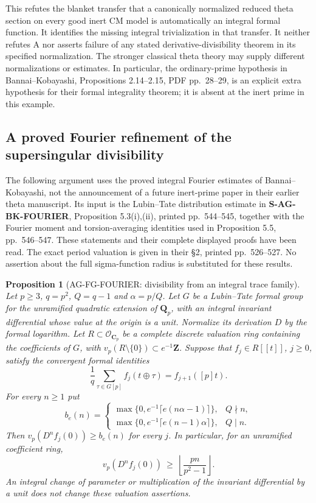 \documentclass[11pt,a4paper]{article}
\newtheorem{proposition}{Proposition}
\begin{document}
This refutes the blanket transfer that a canonically normalized
reduced theta section on every good inert CM model is automatically
an integral formal function. It identifies the missing integral
trivialization in that transfer. It neither refutes A nor asserts
failure of any stated derivative-divisibility theorem in its
specified normalization. The stronger classical theta theory
may supply different normalizations or estimates. In particular,
the ordinary-prime hypothesis in Bannai--Kobayashi,
Propositions 2.14--2.15, PDF pp.~28--29, is an explicit extra
hypothesis for their formal integrality theorem; it is absent
at the inert prime in this example.

\subsection{A proved Fourier refinement of the supersingular divisibility}

The following argument uses the proved integral Fourier estimates of
Bannai--Kobayashi, not the announcement of a future inert-prime paper in
their earlier theta manuscript.  Its input is the Lubin--Tate distribution
estimate in \textbf{S-AG-BK-FOURIER}, Proposition 5.3(i),(ii), printed
pp.~544--545, together with the Fourier moment and torsion-averaging
identities used in Proposition 5.5, pp.~546--547.  These statements and
their complete displayed proofs have been read.  The exact period
valuation is given in their \S2, printed pp.~526--527.  No assertion
about the full sigma-function radius is substituted for these results.

\begin{proposition}[AG-FG-FOURIER: divisibility from an integral trace family]
Let $p\geq3$, $q=p^2$, $Q=q-1$ and $\alpha=p/Q$.  Let $G$ be a
Lubin--Tate formal group for the unramified quadratic extension of
$\mathbf Q_p$, with an integral invariant differential whose value at the
origin is a unit.  Normalize its derivation $D$ by the formal logarithm.
Let $R\subset\mathcal O_{\mathbf C_p}$ be a complete discrete valuation
ring containing the coefficients of $G$, with $v_p(R\setminus\{0\})
\subset e^{-1}\mathbf Z$.  Suppose that $f_j\in R[[t]]$, $j\geq0$,
satisfy the convergent formal identities
\[
 \frac1q\sum_{\tau\in G[p]} f_j(t\mathbin\oplus\tau)
       =f_{j+1}([p]t).                                      \tag{AG-Fourier-trace}
\]
For every $n\geq1$ put
\[
 b_e(n)=
 \begin{cases}
 \max\{0,e^{-1}\lceil e(n\alpha-1)\rceil\},&Q\nmid n,\\
 \max\{0,e^{-1}\lceil e(n-1)\alpha\rceil\},&Q\mid n.
 \end{cases}
\]
Then $v_p(D^nf_j(0))\geq b_e(n)$ for every $j$.  In particular, for
an unramified coefficient ring,
\[
             v_p(D^nf_j(0))\ \geq\ \left\lfloor\frac{pn}{p^2-1}\right\rfloor.
                                                               \tag{AG-Fourier-floor}
\]
An integral change of parameter or multiplication of the invariant
differential by a unit does not change these valuation assertions.
\end{proposition}
\end{document}

